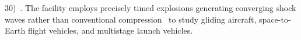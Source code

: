 30)~\cite{jf22_unveiling, jf22_chinadaily}. The facility employs precisely timed explosions generating converging shock waves rather than conventional compression~\cite{jf22_newatlas} to study gliding aircraft, space-to-Earth flight vehicles, and multistage launch vehicles.






